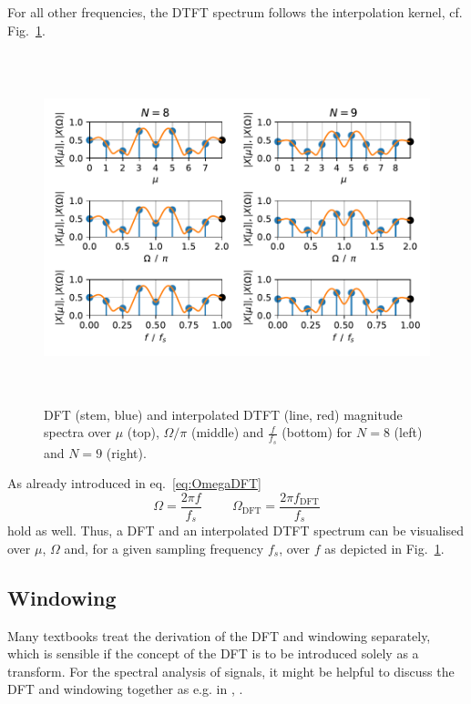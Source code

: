\documentclass[11pt,a4paper,DIV=12]{scrartcl}
\begin{document}
%
For all other frequencies, the DTFT spectrum follows the interpolation kernel,
cf. Fig.~\ref{DTFT_Interpolation}.
%
\begin{figure}
		\centering
		\includegraphics[width=6in, height=4in]{graphics/DTFT_Interpolation.pdf}
		\caption{DFT (stem, blue) and interpolated DTFT (line, red) magnitude
		spectra over $\mu$ (top), $\Omega/\pi$ (middle) and $\frac{f}{f_s}$ (bottom)
		for $N=8$ (left) and $N=9$ (right).}
		\label{DTFT_Interpolation}
\end{figure}
%
As already introduced in eq.~\eqref{eq:OmegaDFT}
%
\begin{equation}
\Omega=\frac{2\pi f}{f_s} \hspace{1cm} \Omega_\text{DFT}=\frac{2\pi f_\text{DFT}}{f_s}
\end{equation}
hold as well.
%
Thus, a DFT and an interpolated DTFT spectrum can be visualised over $\mu$,
$\Omega$ and, for a given sampling frequency $f_s$, over $f$ as depicted in
Fig.~\ref{DTFT_Interpolation}.

\subsection{Windowing}
Many textbooks treat the derivation of the DFT and windowing separately, which
is sensible if the concept of the DFT is to be introduced solely as a transform.
%
For the spectral analysis of signals, it might be helpful to discuss the DFT
and windowing together as e.g. in \cite{Moeser2011},
\cite[Ch.~7.3,~7.4]{Kammeyer2002}.
\end{document}
